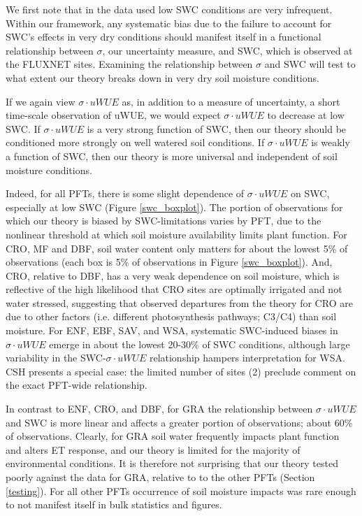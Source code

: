 \documentclass[draft,linenumbers]{agujournal}
\begin{document}
We first note that in the data used low SWC conditions are very
infrequent. Within our framework, any systematic bias due to the
failure to account for SWC's effects in very dry conditions should
manifest itself in a functional relationship between $\sigma$, our
uncertainty measure, and SWC, which is observed at the FLUXNET
sites. Examining the relationship between $\sigma$ and SWC will test
to what extent our theory breaks down in very dry soil moisture
conditions.

If we again view $\sigma \cdot uWUE$ as, in addition to a measure of
uncertainty, a short time-scale observation of uWUE, we would expect
$\sigma \cdot uWUE$ to decrease at low SWC. If $\sigma \cdot uWUE$ is
a very strong function of SWC, then our theory should be conditioned
more strongly on well watered soil conditions. If $\sigma \cdot uWUE$
is weakly a function of SWC, then our theory is more universal and
independent of soil moisture conditions.

Indeed, for all PFTs, there is some slight dependence of
$\sigma \cdot uWUE$ on SWC, especially at low SWC (Figure
\ref{swc_boxplot}). The portion of observations for which our theory
is biased by SWC-limitations varies by PFT, due to the nonlinear
threshold at which soil moisture availability limits plant
function. For CRO, MF and DBF, soil water content only matters for
about the lowest 5\% of observations (each box is 5\% of observations
in Figure \ref{swc_boxplot}). And, CRO, relative to DBF, has a very
weak dependence on soil moisture, which is reflective of the high
likelihood that CRO sites are optimally irrigated and not water
stressed, suggesting that observed departures from the theory for CRO
are due to other factors (i.e. different photosynthesis pathways; C3/C4) than soil
moisture. For ENF, EBF, SAV, and WSA, systematic SWC-induced biases in
$\sigma \cdot uWUE$ emerge in about the lowest 20-30\% of SWC
conditions, although large variability in the SWC-$\sigma \cdot uWUE$
relationship hampers interpretation for WSA. CSH presents a special
case: the limited number of sites (2) preclude comment on the
exact PFT-wide relationship.

In contrast to ENF, CRO, and DBF, for GRA the relationship between
$\sigma \cdot uWUE$ and SWC is more linear and affects a greater
portion of observations; about 60\% of observations. Clearly, for GRA
soil water frequently impacts plant function and alters ET response,
and our theory is limited for the majority of environmental
conditions. It is therefore not surprising that our theory tested
poorly against the data for GRA, relative to to the other PFTs
(Section \ref{testing}). For all other PFTs occurrence of soil
moisture impacts was rare enough to not manifest itself in bulk
statistics and figures.
\end{document}
